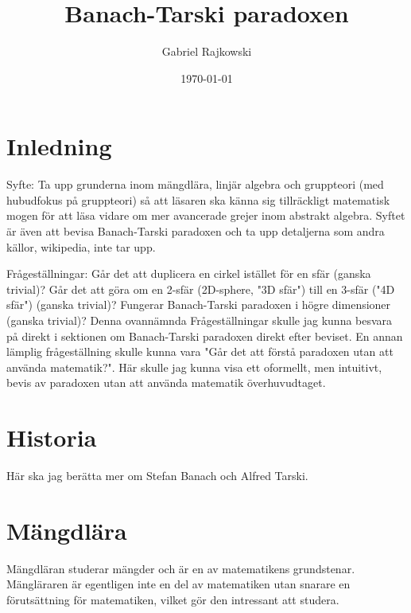 \documentclass{article}
\theoremstyle{definition}
\begin{document}
\title{\LARGE{\textbf{Banach-Tarski paradoxen}}}
\author{Gabriel Rajkowski}
\date{\today}

\maketitle

\thispagestyle{empty}

\clearpage
\tableofcontents
\section{Inledning}
Syfte: Ta upp grunderna inom mängdlära, linjär algebra och gruppteori (med hubudfokus på gruppteori) 
så att läsaren ska känna sig tillräckligt matematisk mogen för att läsa vidare om mer avancerade grejer inom abstrakt algebra.
Syftet är även att bevisa Banach-Tarski paradoxen och ta upp detaljerna som andra källor, wikipedia, inte tar upp.

Frågeställningar: Går det att duplicera en cirkel istället för en sfär (ganska trivial)?
Går det att göra om en 2-sfär (2D-sphere, "3D sfär") till en 3-sfär ("4D sfär")
(ganska trivial)? Fungerar Banach-Tarski paradoxen i högre dimensioner (ganska trivial)?
Denna ovannämnda Frågeställningar skulle jag kunna besvara på direkt i sektionen
om Banach-Tarski paradoxen direkt efter beviset. En annan lämplig frågeställning skulle 
kunna vara "Går det att förstå paradoxen utan att använda matematik?". Här 
skulle jag kunna visa ett oformellt, men intuitivt, bevis av paradoxen utan att 
använda matematik överhuvudtaget. 

\section{Historia}
Här ska jag berätta mer om Stefan Banach och Alfred Tarski.
\section{Mängdlära}
Mängdläran studerar mängder och är en av matematikens grundstenar. 
\linebreak
Mängläraren är egentligen inte en del av
matematiken utan snarare en förutsättning för matematiken, vilket gör den intressant att studera.
\end{document}
